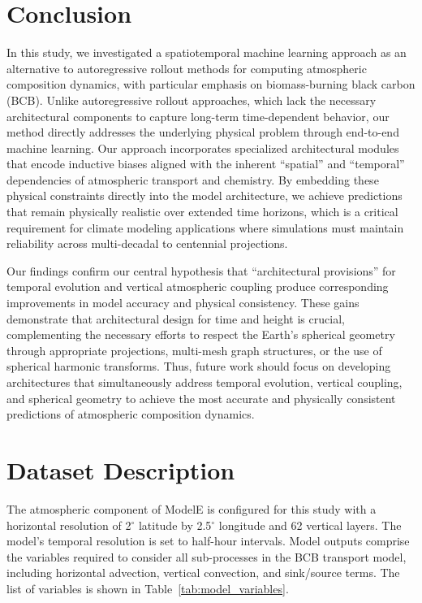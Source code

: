 \documentclass[11pt]{article}
\begin{document}
\section{Conclusion}
    In this study, we investigated a spatiotemporal machine learning approach as an alternative to autoregressive rollout methods for computing atmospheric composition dynamics, with particular emphasis on biomass-burning black carbon (BCB). Unlike autoregressive rollout approaches, which lack the necessary architectural components to capture long-term time-dependent behavior, our method directly addresses the underlying physical problem through end-to-end machine learning. Our approach incorporates specialized architectural modules that encode inductive biases aligned with the inherent ``spatial'' and ``temporal'' dependencies of atmospheric transport and chemistry. By embedding these physical constraints directly into the model architecture, we achieve predictions that remain physically realistic over extended time horizons, which is a critical requirement for climate modeling applications where simulations must maintain reliability across multi-decadal to centennial projections.
    
    Our findings confirm our central hypothesis that ``architectural provisions'' for temporal evolution and vertical atmospheric coupling produce corresponding improvements in model accuracy and physical consistency. These gains demonstrate that architectural design for time and height is crucial, complementing the necessary efforts to respect the Earth's spherical geometry through appropriate projections, multi-mesh graph structures, or the use of spherical harmonic transforms. Thus, future work should focus on developing architectures that simultaneously address temporal evolution, vertical coupling, and spherical geometry to achieve the most accurate and physically consistent predictions of atmospheric composition dynamics.

\newpage



\newpage \appendix
\section{Dataset Description} \label{sec:appendix-1}
    The atmospheric component of ModelE is configured for this study with a horizontal resolution of 2$^\circ$ latitude by 2.5$^\circ$ longitude and 62 vertical layers. The model's temporal resolution is set to half-hour intervals. Model outputs comprise the variables required to consider all sub-processes in the BCB transport model, including horizontal advection, vertical convection, and sink/source terms. The list of variables is shown in Table~\ref{tab:model_variables}.
\end{document}
